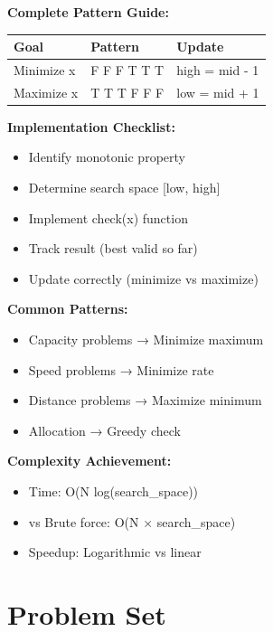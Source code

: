 \documentclass[11pt,a4paper,oneside]{book}
\begin{document}
\begin{tcolorbox}[
    enhanced,breakable,
    colback=primaryblue!10,
    colframe=primaryblue,
    boxrule=2pt,
    arc=4mm,
    title=\textbf{Predicate Functions: Complete Mastery}
]
\textbf{Complete Pattern Guide:}

\begin{center}
\begin{tabular}{|l|l|l|}
\hline
\rowcolor{lightgray}
\textbf{Goal} & \textbf{Pattern} & \textbf{Update} \\
\hline
Minimize x & F F F T T T & high = mid - 1 \\
\hline
Maximize x & T T T F F F & low = mid + 1 \\
\hline
\end{tabular}
\end{center}

\textbf{Implementation Checklist:}
\begin{itemize}
    \item  Identify monotonic property
    \item  Determine search space [low, high]
    \item  Implement check(x) function
    \item  Track result (best valid so far)
    \item  Update correctly (minimize vs maximize)
\end{itemize}

\textbf{Common Patterns:}
\begin{itemize}
    \item Capacity problems → Minimize maximum
    \item Speed problems → Minimize rate
    \item Distance problems → Maximize minimum
    \item Allocation → Greedy check
\end{itemize}

\textbf{Complexity Achievement:}
\begin{itemize}
    \item Time: O(N log(search\_space))
    \item vs Brute force: O(N × search\_space)
    \item Speedup: Logarithmic vs linear
\end{itemize}
\end{tcolorbox}


\section{Problem Set}
\end{document}
